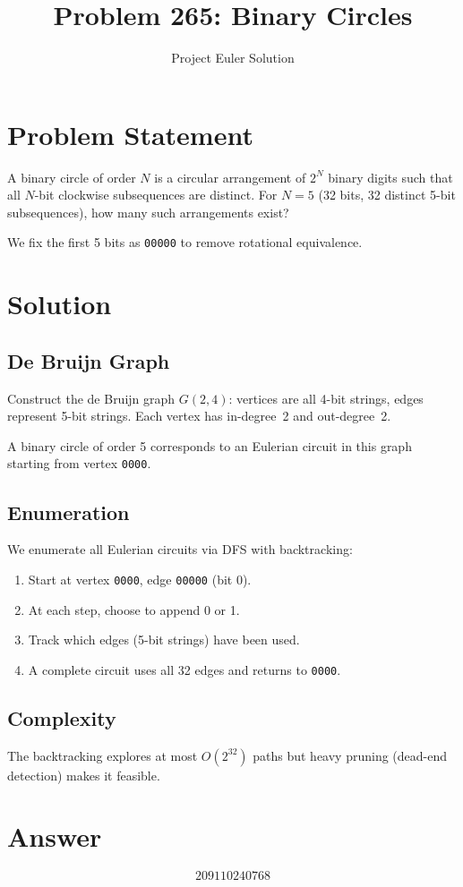 \documentclass[12pt]{article}
\title{Problem 265: Binary Circles}
\author{Project Euler Solution}
\date{}
\begin{document}
\maketitle

\section{Problem Statement}
A binary circle of order $N$ is a circular arrangement of $2^N$ binary digits such that all $N$-bit clockwise subsequences are distinct. For $N=5$ (32 bits, 32 distinct 5-bit subsequences), how many such arrangements exist?

We fix the first 5 bits as \texttt{00000} to remove rotational equivalence.

\section{Solution}

\subsection{De Bruijn Graph}
Construct the de Bruijn graph $G(2, 4)$: vertices are all 4-bit strings, edges represent 5-bit strings. Each vertex has in-degree~2 and out-degree~2.

A binary circle of order 5 corresponds to an Eulerian circuit in this graph starting from vertex \texttt{0000}.

\subsection{Enumeration}
We enumerate all Eulerian circuits via DFS with backtracking:
\begin{enumerate}
\item Start at vertex \texttt{0000}, edge \texttt{00000} (bit 0).
\item At each step, choose to append 0 or 1.
\item Track which edges (5-bit strings) have been used.
\item A complete circuit uses all 32 edges and returns to \texttt{0000}.
\end{enumerate}

\subsection{Complexity}
The backtracking explores at most $O(2^{32})$ paths but heavy pruning (dead-end detection) makes it feasible.

\section{Answer}

\[
\boxed{209110240768}
\]
\end{document}
